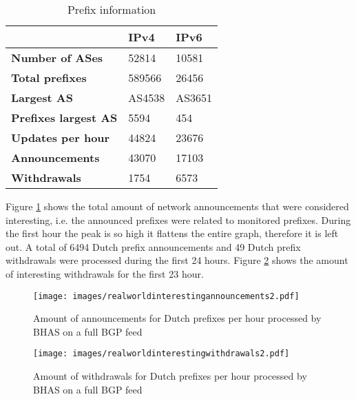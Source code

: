 \begin{table}[]
\centering
\label{table:prefixinformation}
\begin{tabular}{l|l|l|}
    \cline{2-3}
                                                       & \textbf{IPv4} & \textbf{IPv6} \\ \hline
    \multicolumn{1}{|l|}{\textbf{Number of ASes}}      & 52814         & 10581         \\ \hline
    \multicolumn{1}{|l|}{\textbf{Total prefixes}}      & 589566        & 26456         \\ \hline
    \multicolumn{1}{|l|}{\textbf{Largest AS}}          & AS4538        & AS3651        \\ \hline
    \multicolumn{1}{|l|}{\textbf{Prefixes largest AS}} & 5594          & 454           \\ \hline
    \multicolumn{1}{|l|}{\textbf{Updates per hour}}    & 44824         & 23676         \\ \hline
    \multicolumn{1}{|l|}{\textbf{Announcements}}       & 43070         & 17103         \\ \hline
    \multicolumn{1}{|l|}{\textbf{Withdrawals}}         & 1754          & 6573          \\ \hline
\end{tabular}
\caption{Prefix information}
\end{table}

Figure \ref{fig:realworldinterestingannouncements} shows the total amount of network announcements that were considered interesting, i.e. the announced prefixes were related to monitored prefixes. During the first hour the peak is so high it flattens the entire graph, therefore it is left out. A total of 6494 Dutch prefix announcements and 49 Dutch prefix withdrawals were processed during the first 24 hours. Figure \ref{fig:realworldinterestingwithdrawals} shows the amount of interesting withdrawals for the first 23 hour.

\begin{figure}[h]
    \centering
    \texttt{[image: images/realworldinterestingannouncements2.pdf]}
    \caption{Amount of announcements for Dutch prefixes per hour processed by BHAS on a full BGP feed}
    \label{fig:realworldinterestingannouncements}
\end{figure}

\begin{figure}[h]
    \centering
    \texttt{[image: images/realworldinterestingwithdrawals2.pdf]}
    \caption{Amount of withdrawals for Dutch prefixes per hour processed by BHAS on a full BGP feed}
    \label{fig:realworldinterestingwithdrawals}
\end{figure}

